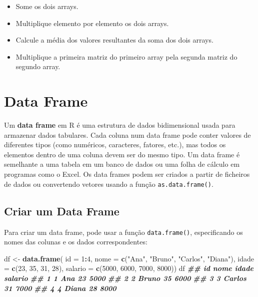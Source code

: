 \documentclass[
]{book}
\newenvironment{Shaded}{\begin{snugshade}}{\end{snugshade}}
\newcommand{\AttributeTok}[1]{\textcolor[rgb]{0.13,0.29,0.53}{#1}}
\newcommand{\DecValTok}[1]{\textcolor[rgb]{0.00,0.00,0.81}{#1}}
\newcommand{\DocumentationTok}[1]{\textcolor[rgb]{0.56,0.35,0.01}{\textbf{\textit{#1}}}}
\newcommand{\FunctionTok}[1]{\textcolor[rgb]{0.13,0.29,0.53}{\textbf{#1}}}
\newcommand{\NormalTok}[1]{#1}
\newcommand{\OtherTok}[1]{\textcolor[rgb]{0.56,0.35,0.01}{#1}}
\newcommand{\SpecialCharTok}[1]{\textcolor[rgb]{0.81,0.36,0.00}{\textbf{#1}}}
\newcommand{\StringTok}[1]{\textcolor[rgb]{0.31,0.60,0.02}{#1}}
\providecommand{\tightlist}{%
  \setlength{\itemsep}{0pt}\setlength{\parskip}{0pt}}
\begin{document}
\begin{itemize}
\tightlist
\item
  Some os dois arrays.
\item
  Multiplique elemento por elemento os dois arrays.
\item
  Calcule a média dos valores resultantes da soma dos dois arrays.
\item
  Multiplique a primeira matriz do primeiro array pela segunda matriz
  do segundo array.
\end{itemize}

\section{Data Frame}\label{data-frame}

Um \textbf{data frame} em R é uma estrutura de dados bidimensional usada para
armazenar dados tabulares. Cada coluna num data frame pode conter
valores de diferentes tipos (como numéricos, caracteres, fatores, etc.),
mas todos os elementos dentro de uma coluna devem ser do mesmo tipo. Um
data frame é semelhante a uma tabela em um banco de dados ou uma folha
de cálculo em programas como o Excel. Os data frames podem ser criados a
partir de ficheiros de dados ou convertendo vetores usando a função
\texttt{as.data.frame()}.

\subsection{Criar um Data Frame}\label{criar-um-data-frame}

Para criar um data frame, pode usar a função \texttt{data.frame()},
especificando os nomes das colunas e os dados correspondentes:

\begin{Shaded}
\begin{Highlighting}[]
\NormalTok{df }\OtherTok{\textless{}{-}} \FunctionTok{data.frame}\NormalTok{(}
\AttributeTok{id =} \DecValTok{1}\SpecialCharTok{:}\DecValTok{4}\NormalTok{,}
\AttributeTok{nome =} \FunctionTok{c}\NormalTok{(}\StringTok{"Ana"}\NormalTok{, }\StringTok{"Bruno"}\NormalTok{, }\StringTok{"Carlos"}\NormalTok{, }\StringTok{"Diana"}\NormalTok{),}
\AttributeTok{idade =} \FunctionTok{c}\NormalTok{(}\DecValTok{23}\NormalTok{, }\DecValTok{35}\NormalTok{, }\DecValTok{31}\NormalTok{, }\DecValTok{28}\NormalTok{),}
\AttributeTok{salario =} \FunctionTok{c}\NormalTok{(}\DecValTok{5000}\NormalTok{, }\DecValTok{6000}\NormalTok{, }\DecValTok{7000}\NormalTok{, }\DecValTok{8000}\NormalTok{))}
\NormalTok{df}
\DocumentationTok{\#\#   id   nome idade salario}
\DocumentationTok{\#\# 1  1    Ana    23    5000}
\DocumentationTok{\#\# 2  2  Bruno    35    6000}
\DocumentationTok{\#\# 3  3 Carlos    31    7000}
\DocumentationTok{\#\# 4  4  Diana    28    8000}
\end{Highlighting}
\end{Shaded}
\end{document}
